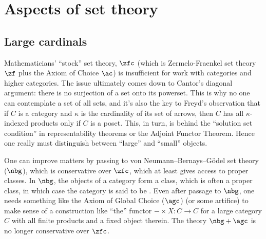 
\chapter{Aspects of set theory}%
\label{cha:aspects_of_set_theory}

\section{Large cardinals}%
\label{sec:large_cardinals}

Mathematicians' \enquote{stock} set theory, $\zfc$ (which is Zermelo-Fraenkel set theory $\zf$ plus the Axiom of Choice $\ac$) is insufficient for work with categories and higher categories.
The issue ultimately comes down to Cantor's diagonal argument:
there is no surjection of a set onto its powerset.
This is why no one can contemplate a set of all sets,
and it's also the key to Freyd's observation that if $C$ is a category and $\kappa$ is the cardinality of its set of arrows,
then $C$ has all $\kappa$-indexed products only if $C$ is a poset.
This, in turn, is behind the \enquote{solution set condition} in representability theorems or the Adjoint Functor Theorem.
Hence one really must distinguish between \enquote{large} and \enquote{small} objects.

One can improve matters by passing to von Neumann--Bernays--Gödel set theory ($\nbg$), which is conservative over $\zfc$,
which at least gives access to proper classes.
In $\nbg$, the objects of a category form a class, which is often a proper class, in which case the category is said to be .
Even after passage to $\nbg$, one needs something like the Axiom of Global Choice ($\agc$) (or some artifice) to make sense of a construction like \enquote{the} functor $ - \times X \colon C \to C $ for a large category $ C $ with all finite products and a fixed object therein.
The theory $\nbg + \agc$ is no longer conservative over $\zfc$.

